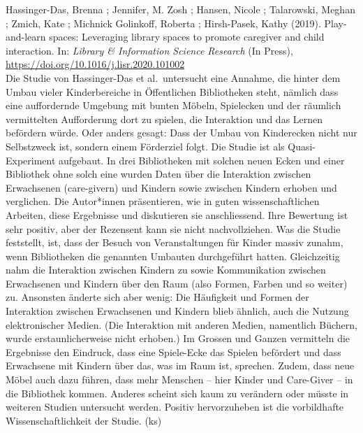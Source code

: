 \documentclass[a4paper,
fontsize=11pt,
oneside,
numbers=noperiodatend,
parskip=half-,
bibliography=totoc,
final
]{scrartcl}
\begin{document}
Hassinger-Das, Brenna ; Jennifer, M. Zosh ; Hansen, Nicole ; Talarowski,
Meghan ; Zmich, Kate ; Michnick Golinkoff, Roberta ; Hirsh-Pasek, Kathy
(2019). Play-and-learn spaces: Leveraging library spaces to promote
caregiver and child interaction. In: \emph{Library \& Information
Science Research} (In Press),
\url{https://doi.org/10.1016/j.lisr.2020.101002}\\
Die Studie von Hassinger-Das et al.~untersucht eine Annahme, die hinter
dem Umbau vieler Kinderbereiche in Öffentlichen Bibliotheken steht,
nämlich dass eine auffordernde Umgebung mit bunten Möbeln, Spielecken
und der räumlich vermittelten Aufforderung dort zu spielen, die
Interaktion und das Lernen befördern würde. Oder anders gesagt: Dass der
Umbau von Kinderecken nicht nur Selbstzweck ist, sondern einem
Förderziel folgt. Die Studie ist als Quasi-Experiment aufgebaut. In drei
Bibliotheken mit solchen neuen Ecken und einer Bibliothek ohne solch
eine wurden Daten über die Interaktion zwischen Erwachsenen
(care-givern) und Kindern sowie zwischen Kindern erhoben und verglichen.
Die Autor*innen präsentieren, wie in guten wissenschaftlichen Arbeiten,
diese Ergebnisse und diskutieren sie anschliessend. Ihre Bewertung ist
sehr positiv, aber der Rezensent kann sie nicht nachvollziehen. Was die
Studie feststellt, ist, dass der Besuch von Veranstaltungen für Kinder
massiv zunahm, wenn Bibliotheken die genannten Umbauten durchgeführt
hatten. Gleichzeitig nahm die Interaktion zwischen Kindern zu sowie
Kommunikation zwischen Erwachsenen und Kindern über den Raum (also
Formen, Farben und so weiter) zu. Ansonsten änderte sich aber wenig: Die
Häufigkeit und Formen der Interaktion zwischen Erwachsenen und Kindern
blieb ähnlich, auch die Nutzung elektronischer Medien. (Die Interaktion
mit anderen Medien, namentlich Büchern, wurde erstaunlicherweise nicht
erhoben.) Im Grossen und Ganzen vermitteln die Ergebnisse den Eindruck,
dass eine Spiele-Ecke das Spielen befördert und dass Erwachsene mit
Kindern über das, was im Raum ist, sprechen. Zudem, dass neue Möbel auch
dazu führen, dass mehr Menschen -- hier Kinder und Care-Giver -- in die
Bibliothek kommen. Anderes scheint sich kaum zu verändern oder müsste in
weiteren Studien untersucht werden. Positiv hervorzuheben ist die
vorbildhafte Wissenschaftlichkeit der Studie. (ks)
\end{document}

